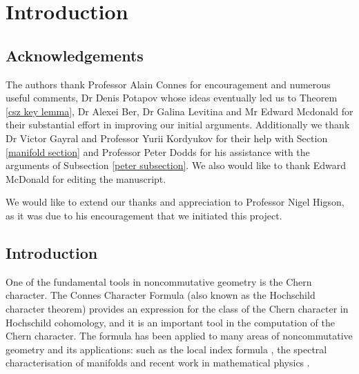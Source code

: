 \chapter{Introduction}\label{intro chapter}

\section*{Acknowledgements}

    The authors thank Professor Alain Connes for encouragement and numerous useful comments, Dr Denis Potapov whose ideas eventually led us to Theorem \ref{csz key lemma}, 
    Dr Alexei Ber, Dr Galina Levitina and Mr Edward Mcdonald for their substantial effort in improving our initial arguments. Additionally we thank Dr Victor Gayral and Professor Yurii Kordyukov for their help with Section \ref{manifold section} and Professor Peter Dodds for his assistance with the arguments of Subsection \ref{peter subsection}. We also would like to thank Edward McDonald for editing the manuscript.
    
    We would like to extend our thanks and appreciation to Professor Nigel Higson, as it was due to his encouragement that we initiated this project.


\section{Introduction}

    One of the fundamental tools in noncommutative geometry
    is the Chern character. The Connes Character Formula (also known as the Hochschild character theorem) provides an expression for the 
    class of the Chern character in Hochschild cohomology, and it is an important
    tool in the computation of the Chern character. The formula has been applied to many areas
    of noncommutative geometry and its applications: such as the local index formula \cite{Connes-Moscovici}, the spectral characterisation of manifolds \cite{Connes-reconstruction} and recent work in mathematical physics \cite{Connes-Chamseddine-Mukhanov-quanta-of-geometry-2015}.

